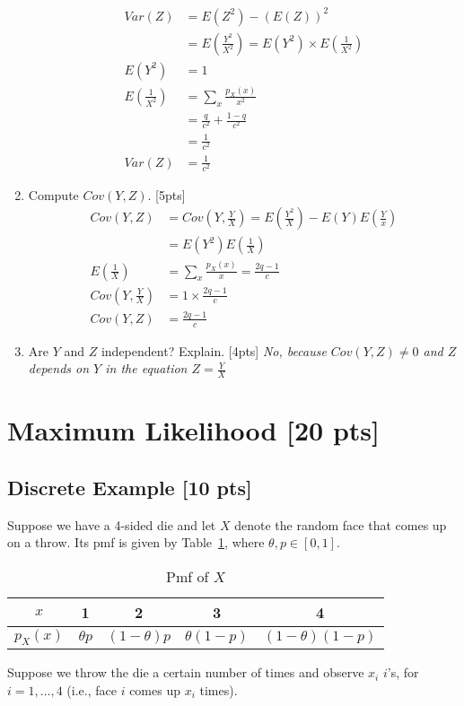 \documentclass{article}
\begin{document}
\begin{enumerate}[label=(\alph*)]
\begin{align*}
            Var(Z) &= E(Z^2) - (E(Z))^2 \\
            &=E(\frac{Y^2}{X^2})=E(Y^2)\times E(\frac{1}{X^2}) \\
            E(Y^2) &= 1 \\
            E(\frac{1}{X^2}) &= \sum_x\frac{p_X(x)}{x^2} \\
            &= \frac{q}{c^2}+\frac{1-q}{c^2} \\
            &=\frac{1}{c^2} \\
            Var(Z) &=\frac{1}{c^2}
        \end{align*}
\item Compute $Cov(Y,Z)$. [5pts] \newline \begin{align*}
    Cov(Y,Z) &= Cov(Y,\frac{Y}{X}) = E(\frac{Y^2}{X}) - E(Y)E(\frac{Y}{x}) \\
    &= E(Y^2)E(\frac{1}{X}) \\
    E(\frac{1}{X}) &= \sum_x\frac{p_X(x)}{x} = \frac{2q-1}{c} \\
    Cov(Y,\frac{Y}{X}) &= 1\times\frac{2q-1}{c} \\
    Cov(Y,Z) &= \frac{2q-1}{c}
\end{align*}
\item Are $Y$ and $Z$ independent? Explain. [4pts] \newline
        \emph{No, because $Cov(Y,Z)\neq0$ and $Z$ depends on $Y$ in the equation $Z=\frac{Y}{X}$}
\end{enumerate}


\section{Maximum Likelihood [20 pts]}
\subsection{Discrete Example [10 pts]}
Suppose we have a 4-sided die and let $X$ denote the random face that comes up on a throw. Its pmf is given by Table~\ref{tab:3.1}, where $\theta,p\in[0,1]$.
\begin{table}[h]
    \centering
    \begin{tabular}{|c|c|c|c|c|}
        \hline
        $x$ & 1 & 2 & 3 & 4 \\\hline
        $p_X(x)$ & $\theta p$ & $(1-\theta)p$ & $\theta(1-p)$ & $(1-\theta)(1-p)$\\\hline
    \end{tabular}
    \caption{Pmf of $X$}
    \label{tab:3.1}
\end{table}
Suppose we throw the die a certain number of times and observe $x_i$ $i$'s, for $i=1,\dots,4$ (i.e., face $i$ comes up $x_i$ times).
\end{document}
